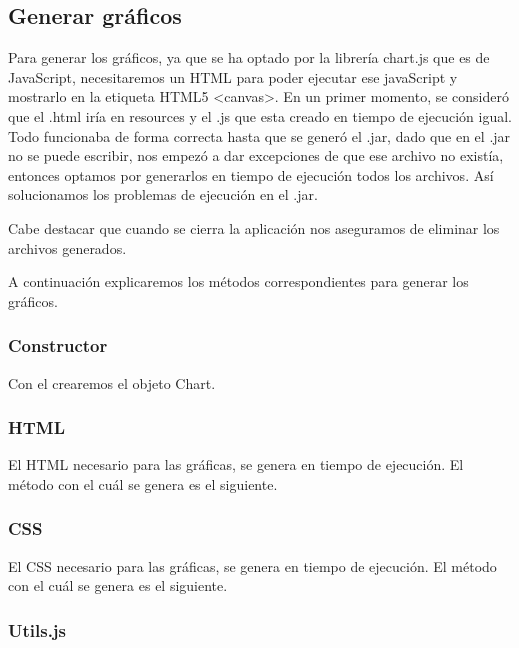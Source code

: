 \subsection{Generar gráficos}\label{generar-graficos}

Para generar los gráficos, ya que se ha optado por la librería chart.js que es de JavaScript, necesitaremos un HTML para poder ejecutar ese javaScript y mostrarlo en la etiqueta HTML5 <canvas>. En un primer momento, se consideró que el .html iría en resources y el .js que esta creado en tiempo de ejecución igual. Todo funcionaba de forma correcta hasta que se generó el .jar, dado que en el .jar no se puede escribir, nos empezó a dar excepciones de que ese archivo no existía, entonces optamos por generarlos en tiempo de ejecución todos los archivos. Así solucionamos los problemas de ejecución en el .jar.

Cabe destacar que cuando se cierra la aplicación nos aseguramos de eliminar los archivos generados.

A continuación explicaremos los métodos correspondientes para generar los gráficos.

\subsubsection{Constructor}\label{constructor-c}

Con el crearemos el objeto Chart.


\subsubsection{HTML}\label{html}

El HTML necesario para las gráficas, se genera en tiempo de ejecución. El método con el cuál se genera es el siguiente.


\subsubsection{CSS}\label{css}

El CSS necesario para las gráficas, se genera en tiempo de ejecución. El método con el cuál se genera es el siguiente.


\subsubsection{Utils.js}\label{utils}

